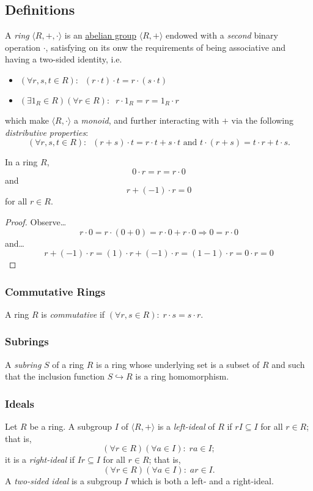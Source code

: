 \subsection{Definitions}\label{ringdefinition}
A \emph{ring} $\langle R, +, \cdot \rangle$ is an \hyperref[abeliangroupdefinition]{abelian group} $\langle R,+ \rangle$ endowed with a \emph{second}
binary operation $\cdot$, satisfying on its onw the requirements of being associative and having a two-sided identity, i.e.
\begin{itemize}
  \item $(\forall r,s,t \in R): \; \; (r \cdot t) \cdot t = r \cdot (s \cdot t)$
  \item $(\exists 1_R \in R) (\forall r \in R): \; \; r \cdot 1_R = r = 1_R \cdot r$
\end{itemize}
which make $\langle R, \cdot \rangle$ a \emph{monoid}, and further interacting with $+$ via the following \emph{distributive properties}:
$$(\forall r,s,t \in R): \; \; (r+s)\cdot t = r \cdot t + s \cdot t \textrm{ and } t \cdot (r + s) = t \cdot r + t \cdot s.$$

\begin{lemma}
In a ring $R$,
$$0 \cdot r = r = r \cdot 0$$
and
$$r + (-1) \cdot r = 0$$
for all $r \in R.$
\end{lemma}

\begin{proof}
Observe\dots
$$r \cdot 0 = r \cdot (0 + 0) = r \cdot 0 + r \cdot 0 \Rightarrow 0 = r \cdot 0$$
and\dots
$$r + (-1) \cdot r = (1) \cdot r + (-1) \cdot r = (1 - 1) \cdot r = 0 \cdot r = 0$$
\end{proof}

\subsubsection{Commutative Rings}\label{commutativeringdefinition}
A ring $R$ is \emph{commutative} if $(\forall r,s \in R): \; r \cdot s = s \cdot r$.

\subsubsection{Subrings}\label{subrings}
A \emph{subring} $S$ of a ring $R$ is a ring whose underlying set is a subset of $R$ and such that
the inclusion function $S \hookrightarrow R$ is a ring homomorphism.

\subsubsection{Ideals}\label{ideal}
Let $R$ be a ring. A subgroup $I$ of $\langle R,+ \rangle$ is a \emph{left-ideal} of $R$ if $rI \subseteq I$
for all $r \in R$; that is,
$$(\forall r \in R)(\forall a \in I): \; ra \in I;$$
it is a \emph{right-ideal} if $Ir \subseteq I$ for all $r \in R$; that is,
$$(\forall r \in R)(\forall a \in I): \; ar \in I.$$
A \emph{two-sided ideal} is a subgroup $I$ which is both a left- and a right-ideal.

